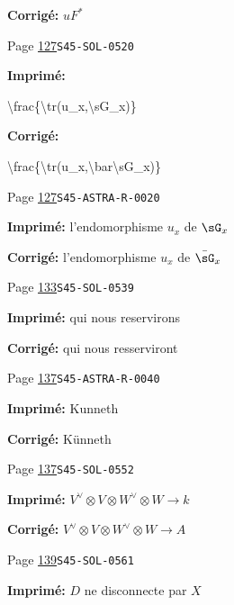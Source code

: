 \documentclass[oneside]{book}
\theoremstyle{sga-source}
\theoremstyle{sga-source-dash}
\theoremstyle{sga-source-dotdash}
\theoremstyle{sga-source-number-note-dash}
\theoremstyle{sga-source-note-number-dotdash}
\theoremstyle{sga-source-example-dotdash}
\theoremstyle{sga-source-inline-number}
\theoremstyle{sga-source-bare-number}
\theoremstyle{sga-source}
\begin{document}
\begin{description}
\par\noindent\textbf{Corrigé:} \(u F^*\)
\smallskip
\item[\hypertarget{apparatus:FR-0091}{91}] Page \hyperlink{printpage:fr:127}{127}\quad\texttt{S45-SOL-0520}
\par\noindent\textbf{Imprimé:} {\footnotesize\ttfamily\raggedright \textbackslash{}\allowbreak{}frac\{\allowbreak{}\textbackslash{}\allowbreak{}tr(\allowbreak{}u\_\allowbreak{}x,\allowbreak{}\textbackslash{}\allowbreak{}sG\_\allowbreak{}x)\allowbreak{}\}\allowbreak{}\par}
\par\noindent\textbf{Corrigé:} {\footnotesize\ttfamily\raggedright \textbackslash{}\allowbreak{}frac\{\allowbreak{}\textbackslash{}\allowbreak{}tr(\allowbreak{}u\_\allowbreak{}x,\allowbreak{}\textbackslash{}\allowbreak{}bar\textbackslash{}\allowbreak{}sG\_\allowbreak{}x)\allowbreak{}\}\allowbreak{}\par}
\smallskip
\item[\hypertarget{apparatus:FR-0092}{92}] Page \hyperlink{printpage:fr:127}{127}\quad\texttt{S45-ASTRA-R-0020}
\par\noindent\textbf{Imprimé:} l'endomorphisme $u_x$ de $\sG_x$
\par\noindent\textbf{Corrigé:} l'endomorphisme $u_x$ de $\bar\sG_x$
\smallskip
\item[\hypertarget{apparatus:FR-0093}{93}] Page \hyperlink{printpage:fr:133}{133}\quad\texttt{S45-SOL-0539}
\par\noindent\textbf{Imprimé:} qui nous reservirons
\par\noindent\textbf{Corrigé:} qui nous resserviront
\smallskip
\item[\hypertarget{apparatus:FR-0094}{94}] Page \hyperlink{printpage:fr:137}{137}\quad\texttt{S45-ASTRA-R-0040}
\par\noindent\textbf{Imprimé:} Kunneth
\par\noindent\textbf{Corrigé:} K\"unneth
\smallskip
\item[\hypertarget{apparatus:FR-0095}{95}] Page \hyperlink{printpage:fr:137}{137}\quad\texttt{S45-SOL-0552}
\par\noindent\textbf{Imprimé:} \(V^\vee\otimes V\otimes W^\vee\otimes W\to k\)
\par\noindent\textbf{Corrigé:} \(V^\vee\otimes V\otimes W^\vee\otimes W\to A\)
\smallskip
\item[\hypertarget{apparatus:FR-0096}{96}] Page \hyperlink{printpage:fr:139}{139}\quad\texttt{S45-SOL-0561}
\par\noindent\textbf{Imprimé:} $D$ ne disconnecte par $X$

\end{description}
\end{document}
